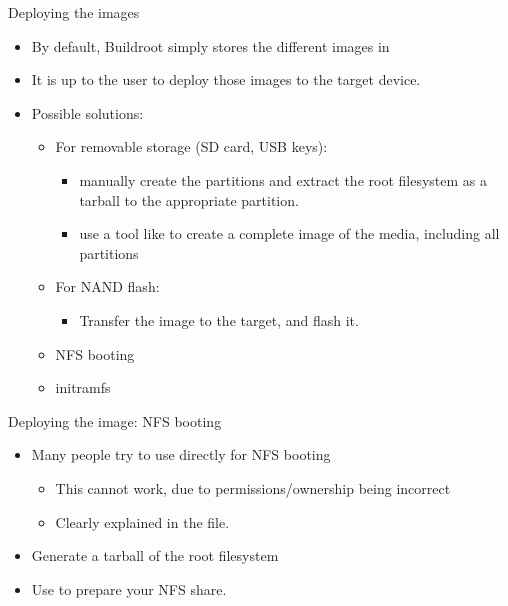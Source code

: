 \begin{frame}{Deploying the images}
  \begin{itemize}
  \item By default, Buildroot simply stores the different images in
  \item It is up to the user to deploy those images to the target
    device.
  \item Possible solutions:
    \begin{itemize}
    \item For removable storage (SD card, USB keys):
      \begin{itemize}
      \item manually create the partitions and extract the root
        filesystem as a tarball to the appropriate partition.
      \item use a tool like  to create a complete image
        of the media, including all partitions
      \end{itemize}
    \item For NAND flash:
      \begin{itemize}
      \item Transfer the image to the target, and flash it.
      \end{itemize}
    \item NFS booting
    \item initramfs
    \end{itemize}
  \end{itemize}
\end{frame}

\begin{frame}{Deploying the image: NFS booting}
  \begin{itemize}
  \item Many people try to use  directly for NFS booting
    \begin{itemize}
    \item This cannot work, due to permissions/ownership being
      incorrect
    \item Clearly explained in the
       file.
    \end{itemize}
  \item Generate a tarball of the root filesystem
  \item Use  to
    prepare your NFS share.
  \end{itemize}
\end{frame}

